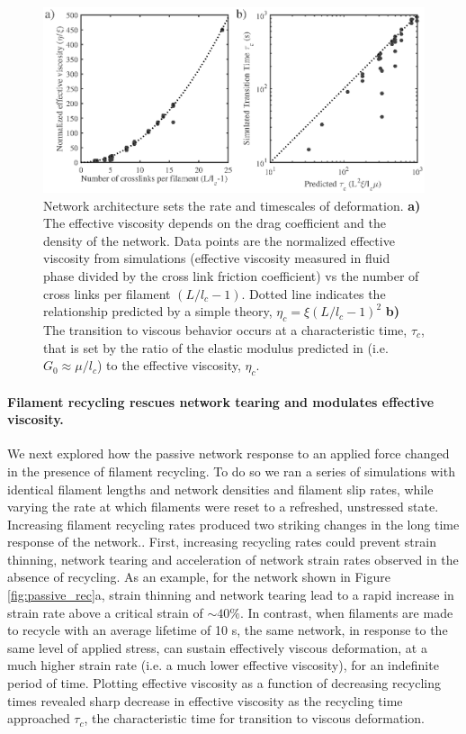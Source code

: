 \documentclass[10pt,letterpaper]{article}
\begin{document}
\begin{figure}[h!]
\centering
\includegraphics[width=\hsize]{figures/figure3b}
\caption{\label{fig:passive_form} Network architecture sets the rate and timescales of deformation. \textbf{a)} The effective viscosity depends on the drag coefficient and the density of the network. Data points are the normalized effective viscosity from simulations (effective viscosity measured in fluid phase divided by the cross link friction coefficient) vs the number of cross links per filament $(L/l_c - 1)$.  Dotted line indicates the relationship predicted by a simple theory, $\eta_c = \xi(L/l_c-1)^2$ \textbf{b)} The transition to viscous behavior occurs at a characteristic time, $\tau_c$, that is set by the ratio of the elastic modulus predicted in \cite{theo_hlm} (i.e. $G_0 \approx \mu/l_c$) to the effective viscosity, $\eta_c$.  }
\end{figure}


\paragraph{Filament recycling rescues network tearing and modulates effective viscosity.}  We next explored how the passive network response to an applied force changed in the presence of filament recycling. To do so we ran a series of simulations with identical filament lengths and network densities and filament slip rates, while varying the rate at which filaments were reset to a refreshed, unstressed state. Increasing  filament recycling rates produced two  striking changes in the long time response of the network.. First, increasing recycling rates could prevent strain thinning, network tearing and acceleration of network strain rates observed in the absence of recycling. As an example,  for the network shown in Figure \ref{fig:passive_rec}a, strain thinning and network tearing  lead to a rapid increase in strain rate above a critical strain of $\sim40\%$. In contrast, when filaments are made to recycle with an average lifetime of 10 s, the same network, in response to the same level of applied stress, can sustain effectively viscous deformation, at a much higher strain rate (i.e. a much lower effective viscosity), for an indefinite period of time.  Plotting effective viscosity as a function of decreasing recycling times revealed sharp decrease in effective viscosity as the recycling time approached $\tau_c$, the characteristic time for transition to viscous deformation.  
\end{document}

